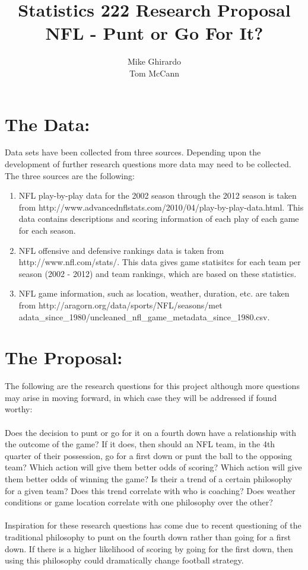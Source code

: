 \documentclass{article}
\begin{document}
\pagestyle{fancy}
\title{\bf Statistics 222 Research Proposal\\NFL - Punt or Go For It?}
\author{ Mike Ghirardo\\ Tom McCann}
\maketitle
\section*{The Data: }

Data sets have been collected from three sources.  Depending upon the development of further research questions more data may need to be collected. The three sources are the following:
\begin{enumerate}
\item
NFL play-by-play data for the 2002 season through the 2012 season is taken from http://www.advancednflstats.com/2010/04/play-by-play-data.html. This data contains descriptions and scoring information of each play of each game for each season.
\item
NFL offensive and defensive rankings data is taken from http://www.nfl.com/stats/. This data gives game statisitcs for each team per season (2002 - 2012) and team rankings, which are based on these statistics. 
\item
NFL game information, such as location, weather, duration, etc. are taken from http://aragorn.org/data/sports/NFL/seasons/met
adata\_since\_1980/uncleaned\_nfl\_game\_metadata\_since\_1980.csv.
\end{enumerate}
\section*{The Proposal: }
The following are the research questions for this project although more questions may arise in moving forward, in which case they will be addressed if found worthy:\\
\smallskip\\
Does the decision to punt or go for it on a fourth down have a relationship with the outcome of the game? If it does, then should an NFL team, in the 4th quarter of their possession, go for a first down or punt the ball to the opposing team?  Which action will give them better odds of scoring? Which action will give them better odds of winning the game? Is their a trend of a certain philosophy  for a given team? Does this trend correlate with who is coaching? Does weather conditions or game location correlate with one philosophy over the other?\\
\smallskip\\
Inspiration for these research questions has come due to recent questioning of the traditional philosophy to punt on the fourth down rather than going for a first down. If there is a higher likelihood of scoring by going for the first down, then using this philosophy could dramatically change football strategy. 
\end{document}
